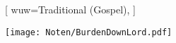[
    wuw={Traditional (Gospel)},
]

\beginverse
\endverse
\centering\texttt{[image: Noten/BurdenDownLord.pdf]}



\endsong
